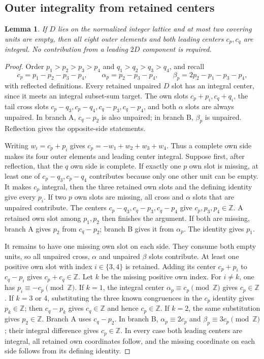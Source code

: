 \documentclass[11pt,a4paper]{article}
\newtheorem{lemma}[theorem]{Lemma}
\theoremstyle{remark}
\newcommand{\Z}{\mathbb Z}
\begin{document}
\subsection{Outer integrality from retained centers}
\begin{lemma}\label{u86:lem:twoemptyintegral}
If $D$ lies on the normalized integer lattice and at most two covering
units are empty, then all eight outer elements and both leading centers
$c_p,c_q$ are integral. No contribution from a leading $2D$ component
is required.
\end{lemma}
\begin{proof}
Order $p_1>p_2>p_3>p_4$ and $q_1>q_2>q_3>q_4$, and recall
\[
 c_p=p_1-p_2-p_3-p_4,\qquad
 \alpha_p=p_2-p_3-p_4,\qquad
 \beta_p=2p_2-p_1-p_3-p_4,
\]
with reflected definitions. Every retained unpaired $D$ slot has an
integral center, since it meets an integral subset-sum target.
The own slots $c_p+p_i,c_q+q_i$, the tail cross slots
$c_p-q_3,c_p-q_4,c_q-p_3,c_q-p_4$, and both $\alpha$ slots are
always unpaired. In branch A, $c_q-p_2$ is also unpaired; in branch B,
$\beta_p$ is unpaired. Reflection gives the opposite-side statements.

Writing $w_i=c_p+p_i$ gives
$c_p=-w_1+w_2+w_3+w_4$. Thus a complete own side makes its four
outer elements and leading center integral. Suppose first, after
reflection, that the $q$ own side is complete. If exactly one $p$ own
slot is missing, at least one of $c_p-q_3,c_p-q_4$ contributes because
only one other unit can be empty. It makes $c_p$ integral, then the
three retained own slots and the defining identity give every $p_i$.
If two $p$ own slots are missing, all cross and $\alpha$ slots that are
unpaired contribute. The centers $c_p-q_3,c_q-p_3,c_q-p_4$ give
$c_p,p_3,p_4\in\Z$. A retained own slot among $p_1,p_2$ then finishes
the argument. If both are missing, branch A gives $p_2$ from $c_q-p_2$;
branch B gives it from $\alpha_p$. The identity gives $p_1$.

It remains to have one missing own slot on each side. They consume both
empty units, so all unpaired cross, $\alpha$ and unpaired $\beta$ slots
contribute. At least one positive own slot with index $i\in\{3,4\}$
is retained. Adding its center $c_p+p_i$ to $c_q-p_i$ gives
$c_p+c_q\in\Z$. Let $k$ be the missing positive own index. For
$i\ne k$, one has $p_i\equiv-c_p\pmod\Z$.
If $k=1$, the integral center $\alpha_p\equiv c_p\pmod\Z$ gives
$c_p\in\Z$. If $k=3$ or 4, substituting the three known congruences
in the $c_p$ identity gives $p_k\in\Z$; then $c_q-p_k$ gives
$c_q\in\Z$ and hence $c_p\in\Z$.
If $k=2$, the same substitution gives $p_2\in\Z$.
Branch A uses $c_q-p_2$. In branch B,
$\alpha_p\equiv2c_p$ and $\beta_p\equiv3c_p\pmod\Z$; their
integral difference gives $c_p\in\Z$. In every case both leading
centers are integral, all retained own coordinates follow, and the
missing coordinate on each side follows from its defining identity.
\end{proof}
\end{document}
